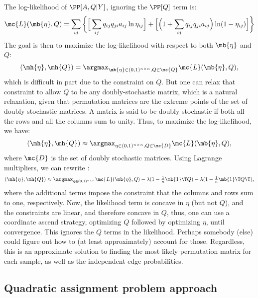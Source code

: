 The log-likelihood of $\PP[A,Q|Y]$, ignoring the $\PP[Q]$ term is:
\begin{align}
	\mc{L}(\mb{\eta},Q)  = \sum_{ij} \bigg\{\Big[\sum_{ij} q_{ij} q_{ji} a_{ij} \ln \eta_{ij}\Big] + \Big[ \Big(1+\sum_{ij} q_{ij} q_{ji} a_{ij}\Big) \ln (1-\eta_{ij})\Big]\bigg\}
\end{align}
The goal is then to maximize the log-likelihood with respect to both $\mb{\eta}$ and $Q$:
\begin{align}
	(\mh{\eta},\mh{Q}) = \argmax_{\mb{\eta} \in (0,1)^{n\times n} ,Q \in \mc{Q}} \mc{L}(\mb{\eta},Q),
\end{align}
which is difficult in part due to the constraint on $Q$.  But one can relax that constraint to allow $Q$ to be any doubly-stochastic matrix, which is a natural relaxation, given that permutation matrices are the extreme points of the set of doubly stochastic matrices.  A matrix is said to be doubly stochastic if both all the rows and all the columns sum to unity.  Thus, to maximize the log-likelihood, we have:
\begin{align}
	(\mh{\eta},\mh{Q}) \approx \argmax_{\eta \in  (0,1)^{n\times n}, Q \in \mc{D}} \mc{L}(\mb{\eta},Q),
\end{align}
where $\mc{D}$ is the set of doubly stochastic matrices.  Using Lagrange multipliers, we can rewrite \label{eq:mle}:
\begin{align}
	(\mh{\eta},\mh{Q}) \approx \argmax_{\eta \in  (0,1)^{n\times n}} \mc{L}(\mb{\eta},Q) - \lambda (1 - \tfrac{1}{n}\mb{1}\T Q) - \lambda (1 - \tfrac{1}{n}\mb{1}\T Q\T),
\end{align}
where the additional terms impose the constraint that the columns and rows sum to one, respectively.  Now, the likelihood term is concave in $\eta$ (but not $Q$), and the constraints are linear, and therefore concave in $Q$, thus, one can use a coordinate ascend strategy, optimizing $Q$ followed by optimizing $\eta$, until convergence. This ignores the $Q$ terms in the likelihood.  Perhaps somebody (else) could figure out how to (at least approximately) account for those.  Regardless, this is an approximate solution to finding the most likely permutation matrix for each sample, as well as the independent edge probabilities.   


\subsection{Quadratic assignment problem approach} %
\label{sub:graph_isomorphism_approach}


